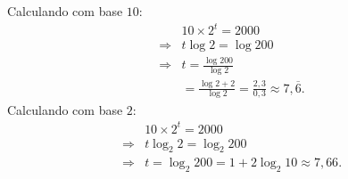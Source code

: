 \documentclass[10 pt,usenames,dvipsnames, oneside]{article}
\begin{document}
\ifdefined\prof
\begin{solucao}

	Calculando com base $10$:
	\begin{align*} &10 \times 2^t = 2000\\
	\Rightarrow& t\log 2 = \log 200\\
	\Rightarrow& t = \frac{\log 200}{\log 2}\\
	& = \frac{\log 2 + 2}{\log 2}= \frac{2{,}3}{0{,}3} \approx 7{,}\overline{6}.
	\end{align*}
	Calculando com base $2$:
	\begin{align*} &10 \times 2^t = 2000\\
	\Rightarrow& t\log_{2} 2 = \log_{2} 200\\
	\Rightarrow& t = \log_{2} 200  = 1+2\log_2 10 \approx 7{,}66.
	\end{align*}

\end{solucao}
\fi
\end{document}
